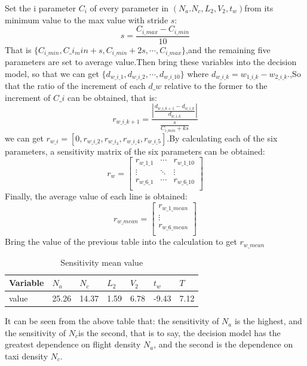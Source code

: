 Set the i parameter $C_i$ of every parameter in $(N_a.N_c,L_2,V_2,t_w)$from its minimum value to the max value with stride $s$:
\begin{equation} s = \frac{C_{i\_max}-C_{i\_min}}{10}\end{equation}
That is $\{C_{i\_min},C\_{i_min}+s,C_{i\_min}+2s,\cdots,C_{i\_max}\}$,and the remaining five parameters are set to average value.Then bring these variables into the decision model, so that we can get $\{d_{w\_i\_1},d_{w\_i\_2},\cdots,d_{w\_i\_10}\}$ where ${d_{w\_i\_k} = w_{1\_i\_k} - w_{2\_i\_k}}$.,So that the ratio of the increment of each $d\_w$ relative to the former to the increment of $C\_i$ can be obtained, that is:
\begin{equation} r_{w\_i\_k+1} = \frac{|\frac{d_{w\_i\_k+1} -d_{w\_i\_k} }{d_{w\_i\_k}}|}{\frac{s}{C_{i\_min}+ks}}\end{equation}
we can get $r_{w\_i} = [0,r_{w\_i\_2},r_{w\_i_3},r_{w\_i\_4},r_{w\_i\_5}]$.By calculating each of the six parameters, a sensitivity matrix of the six parameters can be obtained:
\begin{equation}
r_{w} = 
\left[
\begin{matrix}
 r_{w\_1\_1}  & \cdots & r_{w\_1\_10}      \\
 \vdots  & \ddots & \vdots \\
  r_{w\_6\_1}     & \cdots & r_{w\_6\_10}      \\
\end{matrix}
\right]
\end{equation}
Finally, the average value of each line is obtained:
\begin{equation}
r_{w\_mean} = 
\left[
\begin{matrix}
 r_{w\_1\_mean}       \\
 \vdots \\
  r_{w\_6\_mean}      \\
\end{matrix}
\right]
\end{equation}  
Bring the value of the previous table into the calculation to get $r_{w\_mean}$

\begin{table}[H]
\centering
\caption{ Sensitivity mean value}
\begin{tabularx}{9cm}{lllllll}
\hline                    
 Variable &  $N_a$ & $N_c$ & $L_2$ & $V_2$ & $t_w$ & $T$ \\
\hline
value & 25.26  & 14.37 & 1.59 & 6.78 & -9.43 & 7.12\\
\hline
\end{tabularx}
\end{table}
It can be seen from the above table that: the sensitivity of $N_a$ is the highest, and the sensitivity of $N_c$is the second, that is to say, the decision model has the greatest dependence on flight density $N_a$, and the second is the dependence on taxi density $N_c$.